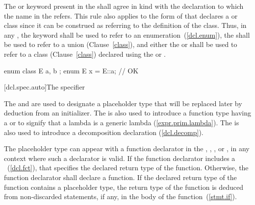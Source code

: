 \pnum
The  or  keyword
present in the
 shall agree in kind with the
declaration to which the name in the
 refers. This rule also applies to
the form of  that declares a
 or  class since it can be construed
as referring to the definition of the class. Thus, in any
, the  keyword
shall be
used to refer to an enumeration~(\ref{dcl.enum}), the 
 shall be used to refer to a union
(Clause~\ref{class}), and either the  or 
 shall be used to refer to a class
(Clause~\ref{class}) declared using the  or 
. \begin{example}

\begin{codeblock}
enum class E { a, b };
enum E x = E::a;                // OK
\end{codeblock}
\end{example}

[dcl.spec.auto]{The  specifier}%

\pnum
The  and  
are used to
designate a placeholder type that will be replaced later by deduction
from an initializer. The 
 is also used to
introduce a function type having a  or to
signify that a lambda is a generic lambda (\ref{expr.prim.lambda}).
The   is also used to introduce a
decomposition declaration (\ref{dcl.decomp}).

\pnum
The placeholder type can appear with a function declarator in the
, ,
, or ,
in any context where such a declarator is valid. If the function declarator
includes a ~(\ref{dcl.fct}), that
 specifies
the declared return type of the function. Otherwise, the function declarator
shall declare a function. If the declared return type of the
function contains a placeholder type, the return type of the function is
deduced from non-discarded  statements, if any, in the body
of the function~(\ref{stmt.if}).

